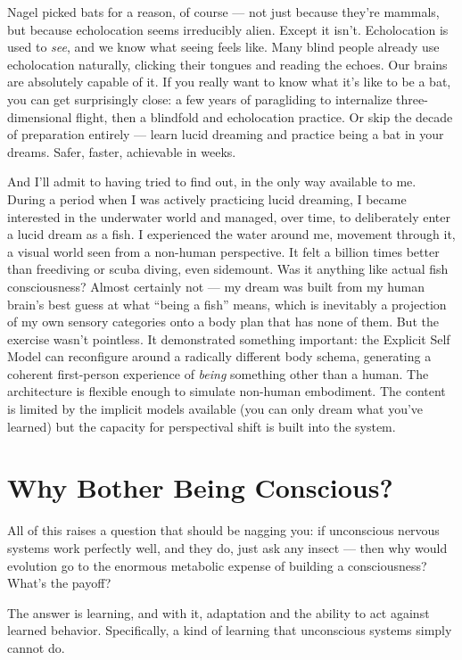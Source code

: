 \documentclass[11pt, twoside, openright]{book}
\begin{document}
Nagel picked bats for a reason, of course --- not just because they're mammals, but because echolocation seems irreducibly alien. Except it isn't. Echolocation is used to \textit{see}, and we know what seeing feels like. Many blind people already use echolocation naturally, clicking their tongues and reading the echoes. Our brains are absolutely capable of it. If you really want to know what it's like to be a bat, you can get surprisingly close: a few years of paragliding to internalize three-dimensional flight, then a blindfold and echolocation practice. Or skip the decade of preparation entirely --- learn lucid dreaming and practice being a bat in your dreams. Safer, faster, achievable in weeks.

And I'll admit to having tried to find out, in the only way available to me. During a period when I was actively practicing lucid dreaming, I became interested in the underwater world and managed, over time, to deliberately enter a lucid dream as a fish. I experienced the water around me, movement through it, a visual world seen from a non-human perspective. It felt a billion times better than freediving or scuba diving, even sidemount. Was it anything like actual fish consciousness? Almost certainly not --- my dream was built from my human brain's best guess at what ``being a fish'' means, which is inevitably a projection of my own sensory categories onto a body plan that has none of them. But the exercise wasn't pointless. It demonstrated something important: the Explicit Self Model can reconfigure around a radically different body schema, generating a coherent first-person experience of \textit{being} something other than a human. The architecture is flexible enough to simulate non-human embodiment. The content is limited by the implicit models available (you can only dream what you've learned) but the capacity for perspectival shift is built into the system.

\section*{Why Bother Being Conscious?}

All of this raises a question that should be nagging you: if unconscious nervous systems work perfectly well, and they do, just ask any insect --- then why would evolution go to the enormous metabolic expense of building a consciousness? What's the payoff?

The answer is learning, and with it, adaptation and the ability to act against learned behavior. Specifically, a kind of learning that unconscious systems simply cannot do.
\end{document}
